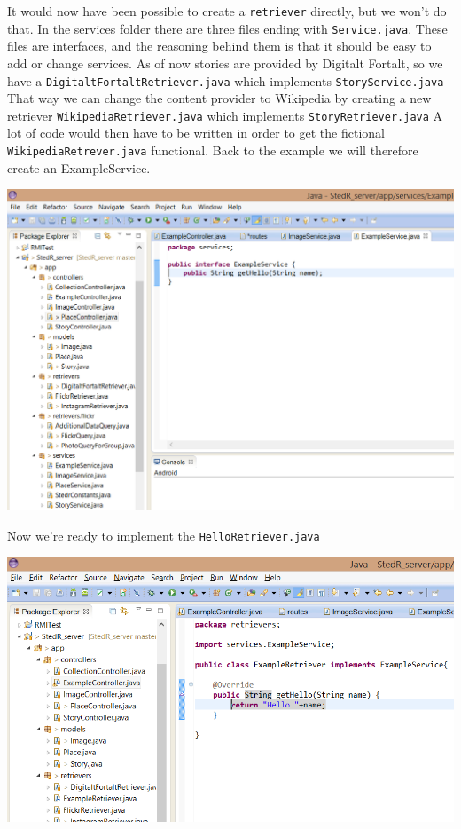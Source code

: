It would now have been possible to create a \texttt{retriever} directly, but we won't do that. In the services folder there are three files ending with  \texttt{Service.java}. These files are interfaces, and the reasoning behind them is that it should be easy to add or change services. As of now stories are provided by Digitalt Fortalt, so we have a \texttt{DigitaltFortaltRetriever.java} which implements \texttt{StoryService.java} That way we can change the content provider to Wikipedia by creating a new retriever \texttt{WikipediaRetriever.java} which implements \texttt{StoryRetriever.java} A lot of code would then have to be written in order to get the fictional \texttt{WikipediaRetrever.java} functional. Back to the example we will therefore create an ExampleService. 

\begin{center}
\includegraphics[scale=0.7]{guide/eclipse4.png} 
\end{center}

Now we're ready to implement the \texttt{HelloRetriever.java}

\begin{center}
\includegraphics[scale=0.7]{guide/eclipse5.png} 
\end{center}

